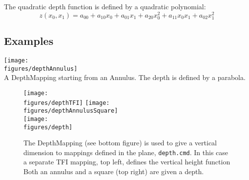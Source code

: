 The quadratic depth function is defined by a quadratic polynomial:
\[
    z(x_0,x_1) =  a_{00} + a_{10} x_0 + a_{01} x_1 + a_{20} x_0^2 + a_{11}x_0 x_1 + a_{02} x_1^2
\]

\subsection{Examples}

\noindent
\begin{minipage}{.4\linewidth}
{\footnotesize
{}
}
\end{minipage}\hfill
\begin{minipage}{.6\linewidth}
  \begin{center}
   \texttt{[image: \\figures/depthAnnulus]} \\
  {A DepthMapping starting from an Annulus. The depth is defined by a parabola.}
  \end{center}
\end{minipage}


\begin{figure}[hbt]
  \begin{center}
 \texttt{[image: \\figures/depthTFI]}
 \texttt{[image: \\figures/depthAnnulusSquare]}\\
 \texttt{[image: \\figures/depth]}
  \caption{The DepthMapping (see bottom figure) 
           is used to give a vertical dimension to mappings defined in the plane, {\tt depth.cmd}.
           In this case a separate TFI mapping, top left, defines the vertical height function
           Both an annulus and a square (top right) are given a depth.}
  \end{center}
\end{figure}




